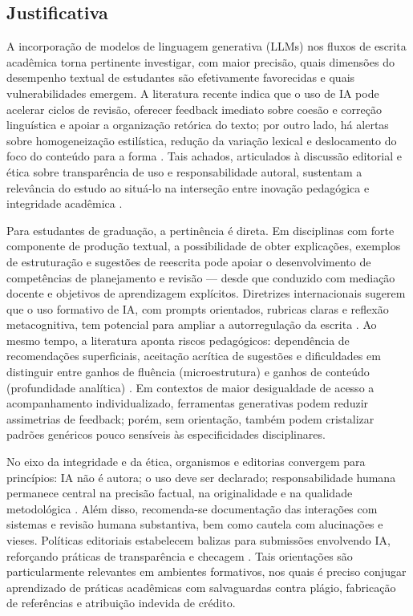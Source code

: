 \subsection{Justificativa}\label{sec:justificativa}

A incorporação de modelos de linguagem generativa (LLMs) nos fluxos de escrita acadêmica torna pertinente investigar, com maior precisão, quais dimensões do desempenho textual de estudantes são efetivamente favorecidas e quais vulnerabilidades emergem. A literatura recente indica que o uso de IA pode acelerar ciclos de revisão, oferecer feedback imediato sobre coesão e correção linguística e apoiar a organização retórica do texto; por outro lado, há alertas sobre homogeneização estilística, redução da variação lexical e deslocamento do foco do conteúdo para a forma \cite{kobak2025llm,geng2024style,yeadon2024ai}. Tais achados, articulados à discussão editorial e ética sobre transparência de uso e responsabilidade autoral, sustentam a relevância do estudo ao situá-lo na interseção entre inovação pedagógica e integridade acadêmica \cite{thorp2023notauthor,nature2023groundrules,cope2023ai,wame2023recs,icmje2023ai}.

Para estudantes de graduação, a pertinência é direta. Em disciplinas com forte componente de produção textual, a possibilidade de obter explicações, exemplos de estruturação e sugestões de reescrita pode apoiar o desenvolvimento de competências de planejamento e revisão — desde que conduzido com mediação docente e objetivos de aprendizagem explícitos. Diretrizes internacionais sugerem que o uso formativo de IA, com prompts orientados, rubricas claras e reflexão metacognitiva, tem potencial para ampliar a autorregulação da escrita \cite{unesco2023diretrizes,educause2023gai}. Ao mesmo tempo, a literatura aponta riscos pedagógicos: dependência de recomendações superficiais, aceitação acrítica de sugestões e dificuldades em distinguir entre ganhos de fluência (microestrutura) e ganhos de conteúdo (profundidade analítica) \cite{geng2024style,yeadon2024ai}. Em contextos de maior desigualdade de acesso a acompanhamento individualizado, ferramentas generativas podem reduzir assimetrias de feedback; porém, sem orientação, também podem cristalizar padrões genéricos pouco sensíveis às especificidades disciplinares.

No eixo da integridade e da ética, organismos e editorias convergem para princípios: IA não é autora; o uso deve ser declarado; responsabilidade humana permanece central na precisão factual, na originalidade e na qualidade metodológica \cite{thorp2023notauthor,cope2023ai,wame2023recs,icmje2023ai}. Além disso, recomenda-se documentação das interações com sistemas e revisão humana substantiva, bem como cautela com alucinações e vieses. Políticas editoriais estabelecem balizas para submissões envolvendo IA, reforçando práticas de transparência e checagem \cite{nature2023groundrules}. Tais orientações são particularmente relevantes em ambientes formativos, nos quais é preciso conjugar aprendizado de práticas acadêmicas com salvaguardas contra plágio, fabricação de referências e atribuição indevida de crédito.


